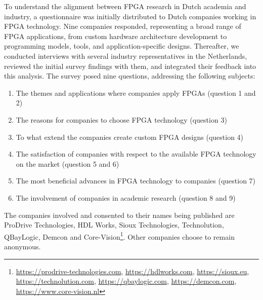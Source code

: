




To understand the alignment between FPGA research in Dutch academia and industry, a questionnaire was initially distributed to Dutch companies working in FPGA technology. Nine companies responded, representing a broad range of FPGA applications, from custom hardware architecture development to programming models, tools, and application-specific designs. Thereafter, we conducted interviews with several industry representatives in the Netherlands, reviewed the initial survey findings with them, and integrated their feedback into this analysis. The survey posed nine questions, addressing the following subjects:
\begin{enumerate}
    \item The themes and applications where companies apply FPGAs (question 1 and 2)
    \item The reasons for companies to choose FPGA technology (question 3)
    \item To what extend the companies create custom FPGA designs (question 4)
    \item The satisfaction of companies with respect to the available FPGA technology on the market (question 5 and 6)
    \item The most beneficial advances in FPGA technology to companies (question 7)
    \item The involvement of companies in academic research (question 8 and 9)
\end{enumerate}
The companies involved and consented to their names being published are ProDrive Technologies, HDL Works, Sioux Technologies, Technolution, QBayLogic, Demcon and Core-Vision\footnote{\url{https://prodrive-technologies.com}, \url{https://hdlworks.com}, \url{https://sioux.eu}, \url{https://technolution.com}, \url{https://qbaylogic.com}, \url{https://demcon.com}, \url{https://www.core-vision.nl}}. Other companies choose to remain anonymous. 

